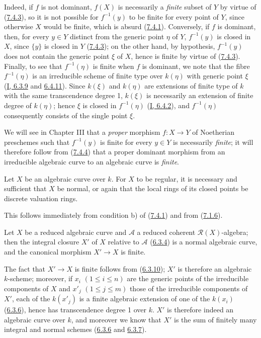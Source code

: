 Indeed, if $f$ is not dominant, $f(X)$ is necessarily a \emph{finite}
subset of $Y$ by virtue of (\hyperref[II.7.4.3]{7.4.3}), so it is not
possible for $f^{-1}(y)$ to be finite for every point of $Y$, since otherwise
$X$ would be finite, which is absurd (\hyperref[II.7.4.1]{7.4.1}).
Conversely, if $f$ is dominant, then, for every $y\in Y$ distinct from the
generic point $\eta$ of $Y$, $f^{-1}(y)$ is closed in $X$, since $\{y\}$ is
closed in $Y$ (\hyperref[II.7.4.3]{7.4.3}); on the other hand, by
hypothesis, $f^{-1}(y)$ does not contain the generic point $\xi$ of $X$, hence
is finite by virtue of (\hyperref[II.7.4.3]{7.4.3}). Finally, to see that
$f^{-1}(\eta)$ is finite when $f$ is dominant, we note that the fibre
$f^{-1}(\eta)$ is an irreducible scheme of finite type over $k(\eta)$ with
generic point $\xi$
(\hyperref[I.6.3.9]{I, 6.3.9} and
\hyperref[I.6.4.11]{6.4.11}). Since $k(\xi)$ and $k(\eta)$ are
extensions of finite type of $k$ with the same transcendence degree 1, $k(\xi)$
is necessarily an extension of finite degree of $k(\eta)$; hence $\xi$ is
closed in $f^{-1}(\eta)$ (\hyperref[I.6.4.2]{I, 6.4.2}), and $f^{-1}(\eta)$
consequently consists of the single point $\xi$.

We will see in Chapter III that a \emph{proper} morphism $f:X\to Y$ of
Noetherian preschemes such that $f^{-1}(y)$ is finite for every $y\in Y$ is
necessarily \emph{finite}; it will therefore follow from
(\hyperref[II.7.4.4]{7.4.4}) that a proper dominant morphism from an
irreducible algebraic curve to an algebraic curve is \emph{finite}.

\begin{corollary}[7.4.5]
\label{II.7.4.5}
Let $X$ be an algebraic curve over $k$. For $X$ to be regular, it is necessary
and sufficient that $X$ be normal, or again that the local rings of its
closed points be discrete valuation rings.
\end{corollary}

This follows immediately from condition b) of
(\hyperref[II.7.4.1]{7.4.1}) and from
(\hyperref[II.7.1.6]{7.1.6}).

\begin{corollary}[7.4.6]
\label{II.7.4.6}
Let $X$ be a reduced algebraic curve and $\mathcal{A}$ a reduced coherent
$\mathcal{R}(X)$-algebra; then the integral closure $X'$
of $X$ relative to $\mathcal{A}$ (\hyperref[II.6.3.4]{6.3.4}) is a
normal algebraic curve, and the canonical morphism $X'\to X$ is finite.
\end{corollary}

The fact that $X'\to X$ is finite follows from
(\hyperref[II.6.3.10]{6.3.10}); $X'$ is therefore an algebraic $k$-scheme;
moreover, if $x_i$ $(1\leq i\leq n)$ are the generic points of the irreducible
components of $X$ and $x'_j$ $(1\leq j\leq m)$ those of the irreducible
components of $X'$, each of the $k(x'_j)$ is a finite algebraic extension of
one of the $k(x_i)$ (\hyperref[II.6.3.6]{6.3.6}), hence has transcendence
degree 1 over $k$. $X'$ is therefore indeed an algebraic curve over $k$, and
moreover we know that $X'$ is the sum of finitely many integral and normal
schemes (\hyperref[II.6.3.6]{6.3.6} and
\hyperref[II.6.3.7]{6.3.7}).

